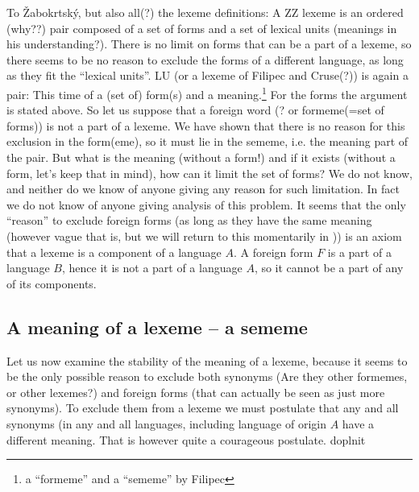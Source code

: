 To Žabokrtský, but also all(?) the lexeme definitions: A ZZ lexeme is an ordered (why??) pair composed of a set of forms and a set of lexical units (meanings in his understanding?). There is no limit on forms that can be a part of a lexeme, so there seems to be no reason to exclude the forms of a different language, as long as they fit the ``lexical units''. LU (or a lexeme of Filipec and Cruse(?)) is again a pair: This time of a (set of) form(s) and a meaning.\footnote{a ``formeme'' and a ``sememe'' by Filipec} For the forms the argument is stated above. So let us suppose that a foreign word (? or formeme(=set of forms)) is not a part of a lexeme. We have shown that there is no reason for this exclusion in the form(eme), so it must lie in the sememe, i.e. the meaning part of the pair. But what is the meaning (without a form!) and if it exists (without a form, let's keep that in mind), how can it limit the set of forms? We do not know, and neither do we know of anyone giving any reason for such limitation. In fact we do not know of anyone giving analysis of this problem. It seems that the only ``reason'' to exclude foreign forms (as long as they have the same meaning (however vague that is, but we will return to this momentarily in )) is an axiom that a lexeme is a component of a language $A$. A foreign form $F$ is a part of a language $B$, hence it is not a part of a language $A$, so it cannot be a part of any of its components.

\subsection{A meaning of a lexeme -- a sememe}
\label{sec:meaning-stability}
Let us now examine the stability of the meaning of a lexeme, because it seems to be the only possible reason to exclude both synonyms (Are they other formemes, or other lexemes?) and foreign forms (that can actually be seen as just more synonyms). To exclude them from a lexeme we must postulate that any and all synonyms (in any and all languages, including language of origin $A$ have a different meaning. That is however quite a courageous postulate.
{\xxx doplnit}
